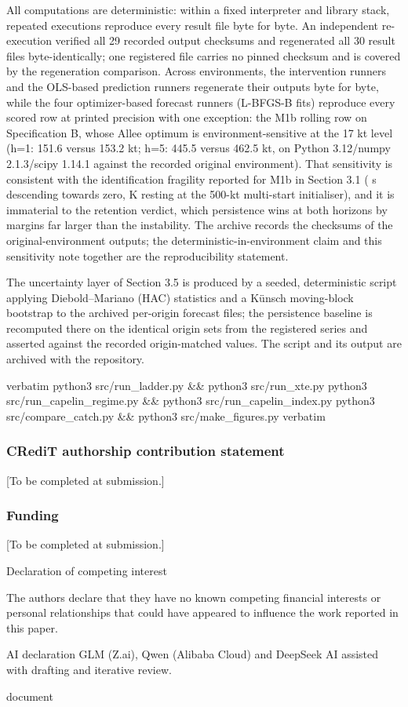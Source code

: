 \documentclass[11pt]{article}
\begin{document}
All computations are deterministic: within a fixed interpreter and
library stack, repeated executions reproduce every result file byte for
byte. An independent re-execution verified all 29 recorded output
checksums and regenerated all 30 result files byte-identically; one
registered file carries no pinned checksum and is covered by the
regeneration comparison. Across environments, the intervention runners
and the OLS-based prediction runners regenerate their outputs byte for
byte, while the four optimizer-based forecast runners (L-BFGS-B fits)
reproduce every scored row at printed precision with one exception: the
M1b rolling row on Specification B, whose Allee optimum is
environment-sensitive at the 17 kt level (h=1: 151.6 versus 153.2 kt;
h=5: 445.5 versus 462.5 kt, on Python 3.12/numpy 2.1.3/scipy 1.14.1
against the recorded original environment). That sensitivity is
consistent with the identification fragility reported for M1b in Section
3.1 ( s descending towards zero, K resting at the 500-kt multi-start
initialiser), and it is immaterial to the retention verdict, which
persistence wins at both horizons by margins far larger than the
instability. The archive records the checksums of the
original-environment outputs; the deterministic-in-environment claim and
this sensitivity note together are the reproducibility statement.

The uncertainty layer of Section 3.5 is produced by a seeded,
deterministic script applying Diebold--Mariano (HAC) statistics and a
Künsch moving-block bootstrap to the archived per-origin forecast files;
the persistence baseline is recomputed there on the identical origin
sets from the registered series and asserted against the recorded
origin-matched values. The script and its output are archived with the
repository.

verbatim python3 src/run\_ladder.py \&\& python3 src/run\_xte.py python3
src/run\_capelin\_regime.py \&\& python3 src/run\_capelin\_index.py
python3 src/compare\_catch.py \&\& python3 src/make\_figures.py verbatim

\subsubsection{CRediT authorship contribution
statement}\label{credit-authorship-contribution-statement}

{[}To be completed at submission.{]}

\subsubsection{Funding}\label{funding}

{[}To be completed at submission.{]}

Declaration of competing interest

The authors declare that they have no known competing financial
interests or personal relationships that could have appeared to
influence the work reported in this paper.

AI declaration GLM (Z.ai), Qwen (Alibaba Cloud) and DeepSeek AI assisted
with drafting and iterative review.

document
\end{document}
